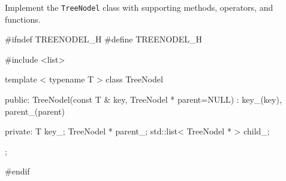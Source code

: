 Implement the \verb!TreeNodel! class with supporting
methods, operators, and functions.

\begin{console}[fontsize=\footnotesize]
#ifndef TREENODEL_H
#define TREENODEL_H

#include <list>

template < typename T >
class TreeNodel
{
public:
    TreeNodel(const T & key,
              TreeNodel * parent=NULL)
        : key_(key), parent_(parent)
    {}

private:
    T key_;
    TreeNodel * parent_;
    std::list< TreeNodel * > child_;
};

#endif
\end{console}

